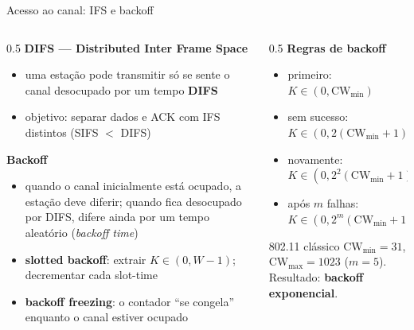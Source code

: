 \documentclass[aspectratio=169,11pt]{beamer}
\begin{document}
\begin{frame}{Acesso ao canal: IFS e backoff}
  \begin{columns}
    \begin{column}{0.5\textwidth}
      \textbf{DIFS --- Distributed Inter Frame Space}
      \begin{itemize}
        \item uma estação pode transmitir só se sente o canal desocupado por um tempo \textbf{DIFS}
        \item objetivo: separar dados e ACK com IFS distintos (SIFS $<$ DIFS)
      \end{itemize}
      \textbf{Backoff}
      \begin{itemize}
        \item quando o canal inicialmente está ocupado, a estação deve diferir; quando fica desocupado por DIFS, difere ainda por um tempo aleatório (\emph{backoff time})
        \item \textbf{slotted backoff}: extrair $K\in(0,W-1)$; decrementar cada slot-time
        \item \textbf{backoff freezing}: o contador ``se congela'' enquanto o canal estiver ocupado
      \end{itemize}
    \end{column}
    \begin{column}{0.5\textwidth}
      \textbf{Regras de backoff}
      \begin{itemize}
        \item primeiro: $K\in(0,\mathrm{CW}_{\min})$
        \item sem sucesso: $K\in(0, 2(\mathrm{CW}_{\min}+1)-1)$
        \item novamente: $K\in(0, 2^2(\mathrm{CW}_{\min}+1)-1)$
        \item após $m$ falhas: $K\in(0, 2^m(\mathrm{CW}_{\min}+1)-1)$
      \end{itemize}
      \begin{exampleblock}{802.11 clássico}
        $\mathrm{CW}_{\min}=31$, $\mathrm{CW}_{\max}=1023$ ($m=5$). Resultado: \textbf{backoff exponencial}.
      \end{exampleblock}
      \begin{center}
      \end{center}
    \end{column}
  \end{columns}
\end{frame}
\end{document}
